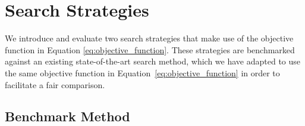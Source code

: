 \documentclass{elsarticle}
\begin{document}
\section{Search Strategies} \label{sec:search}

We introduce and evaluate two search strategies that make use of the objective function in Equation \ref{eq:objective_function}. These strategies are benchmarked against an existing state-of-the-art search method, which we have adapted to use the same objective function in Equation~\ref{eq:objective_function} in order to facilitate a fair comparison. 


\subsection{Benchmark Method}
\end{document}
